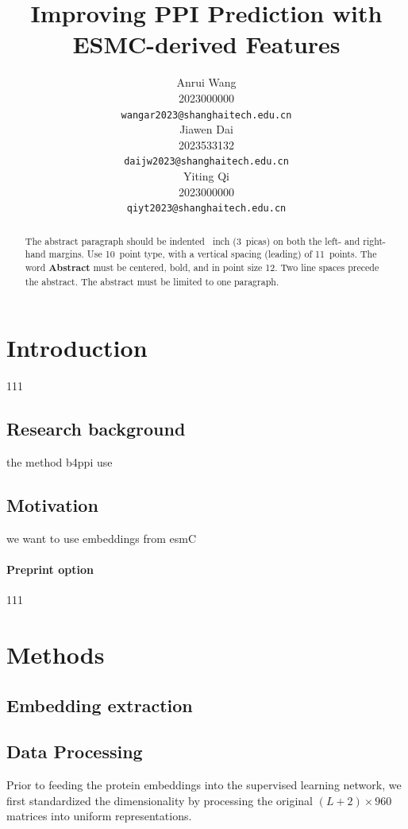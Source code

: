 \documentclass{article}
\title{Improving PPI Prediction with ESMC-derived Features}
\author{
	Anrui Wang \\
	2023000000 \\
	\texttt{wangar2023@shanghaitech.edu.cn}\\
	\AND
	Jiawen Dai \\
	2023533132 \\
	\texttt{daijw2023@shanghaitech.edu.cn}\\
	 \AND
	 Yiting Qi \\
	 2023000000 \\
	 \texttt{qiyt2023@shanghaitech.edu.cn}\\
}
\begin{document}
	
	
	\maketitle
	
	
	\begin{abstract}
		The abstract paragraph should be indented ~inch (3~picas) on
		both the left- and right-hand margins. Use 10~point type, with a vertical
		spacing (leading) of 11~points.  The word \textbf{Abstract} must be centered,
		bold, and in point size 12. Two line spaces precede the abstract. The abstract
		must be limited to one paragraph.
	\end{abstract}
	
	
	\section{Introduction}

	
	111
	
	
	\subsection{Research background}
	
	
	the method b4ppi use
	
	
	\subsection{Motivation}
	
	
	we want to use embeddings from esmC
	
	
	\paragraph{Preprint option}
	111
	
	
	\section{Methods}

	\subsection{Embedding extraction}
	\subsection{Data Processing}

	Prior to feeding the protein embeddings into the supervised learning network, we first standardized the dimensionality by processing the original $(L+2) \times 960$ matrices into uniform representations.
	
\end{document}
